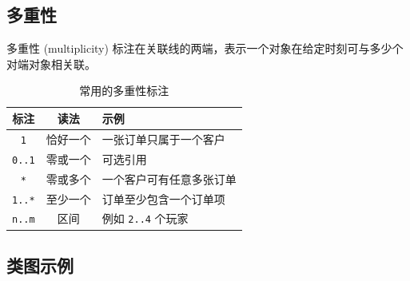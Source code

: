 \subsection{多重性}

多重性 (multiplicity) 标注在关联线的两端，表示一个对象在给定时刻可与多少个对端对象相关联。

\begin{table}[H]
\centering
\caption{常用的多重性标注}
\begin{tabulary}{\textwidth}{CCL}
\toprule
标注 & 读法 & 示例 \\
\midrule
\texttt{1} & 恰好一个 & 一张订单只属于一个客户 \\
\texttt{0..1} & 零或一个 & 可选引用 \\
\texttt{*} & 零或多个 & 一个客户可有任意多张订单 \\
\texttt{1..*} & 至少一个 & 订单至少包含一个订单项 \\
\texttt{n..m} & 区间 & 例如 \texttt{2..4} 个玩家 \\
\bottomrule
\end{tabulary}
\end{table}

\subsection{类图示例}

